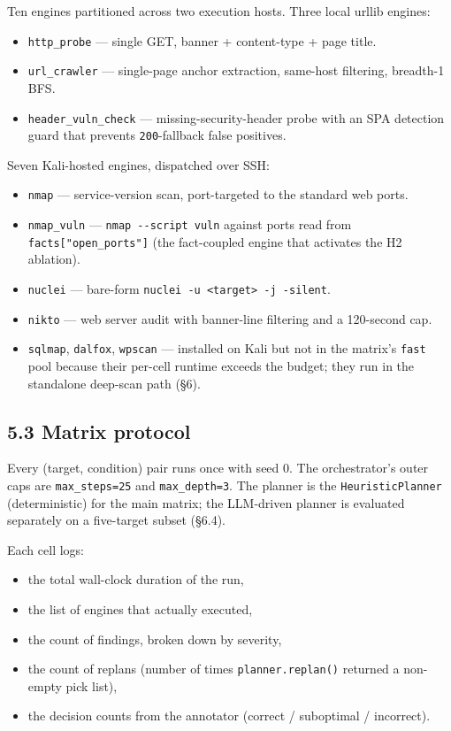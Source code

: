\documentclass[
]{article}
\providecommand{\tightlist}{%
  \setlength{\itemsep}{0pt}\setlength{\parskip}{0pt}}
\begin{document}
Ten engines partitioned across two execution hosts. Three local urllib
engines:

\begin{itemize}
\tightlist
\item
  \texttt{http\_probe} --- single GET, banner + content-type + page
  title.
\item
  \texttt{url\_crawler} --- single-page anchor extraction, same-host
  filtering, breadth-1 BFS.
\item
  \texttt{header\_vuln\_check} --- missing-security-header probe with an
  SPA detection guard that prevents \texttt{200}-fallback false
  positives.
\end{itemize}

Seven Kali-hosted engines, dispatched over SSH:

\begin{itemize}
\tightlist
\item
  \texttt{nmap} --- service-version scan, port-targeted to the standard
  web ports.
\item
  \texttt{nmap\_vuln} --- \texttt{nmap\ -\/-script\ vuln} against ports
  read from \texttt{facts{[}"open\_ports"{]}} (the fact-coupled engine
  that activates the H2 ablation).
\item
  \texttt{nuclei} --- bare-form
  \texttt{nuclei\ -u\ \textless{}target\textgreater{}\ -j\ -silent}.
\item
  \texttt{nikto} --- web server audit with banner-line filtering and a
  120-second cap.
\item
  \texttt{sqlmap}, \texttt{dalfox}, \texttt{wpscan} --- installed on
  Kali but not in the matrix's \texttt{fast} pool because their per-cell
  runtime exceeds the budget; they run in the standalone deep-scan path
  (§6).
\end{itemize}

\subsection{5.3 Matrix protocol}\label{matrix-protocol}

Every (target, condition) pair runs once with seed 0. The orchestrator's
outer caps are \texttt{max\_steps=25} and \texttt{max\_depth=3}. The
planner is the \texttt{HeuristicPlanner} (deterministic) for the main
matrix; the LLM-driven planner is evaluated separately on a five-target
subset (§6.4).

Each cell logs:

\begin{itemize}
\tightlist
\item
  the total wall-clock duration of the run,
\item
  the list of engines that actually executed,
\item
  the count of findings, broken down by severity,
\item
  the count of replans (number of times \texttt{planner.replan()}
  returned a non-empty pick list),
\item
  the decision counts from the annotator (correct / suboptimal /
  incorrect).
\end{itemize}
\end{document}
